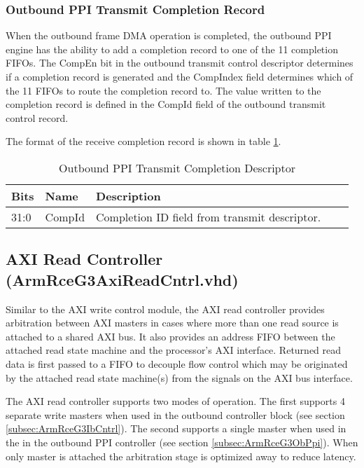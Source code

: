 \documentclass[11pt]{article}
\begin{document}
\subsubsection{Outbound PPI Transmit Completion Record}

When the outbound frame DMA operation is completed, the outbound PPI engine has the ability to add a completion record to one of the 11 
completion FIFOs. The CompEn bit in the outbound transmit control descriptor determines if a completion record is 
generated and the CompIndex field determines which of the 11 FIFOs to route the completion record to. The value written 
to the completion record is defined in the CompId field of the outbound transmit control record. 

The format of the receive completion record is shown in table \ref{tab:ob_ppi_comp}.

\begin{table}[H]
\small
\centering
   \begin{tabular}{| l | l | l | l | l | } 
      \hline \textbf{Bits} & \textbf{Name} & \textbf{Description} \\
      \hline 31:0          & CompId        & Completion ID field from transmit descriptor.                           \\
      \hline
   \end{tabular}
   \caption{Outbound PPI Transmit Completion Descriptor}
   \label{tab:ob_ppi_comp}
\end{table}

\subsection{AXI Read Controller (ArmRceG3AxiReadCntrl.vhd)}
\label{subsec:ArmRceG3AxiReadCntrl}

Similar to the AXI write control module, the AXI read controller provides arbitration between AXI masters in cases
where more than one read source is attached to a shared AXI bus. It also provides an address FIFO 
between the attached read state machine and the processor's AXI interface. Returned read data is first
passed to a FIFO to decouple flow control which may be originated by the attached read state machine(s) from
the signals on the AXI bus interface.

The AXI read controller supports two modes of operation. The first supports 4 separate write masters when
used in the outbound controller block (see section \ref{subsec:ArmRceG3IbCntrl}). The second supports a single 
master when used in the in the outbound PPI controller (see section \ref{subsec:ArmRceG3ObPpi}).
When only master is attached the arbitration stage is optimized away to reduce latency.
\end{document}
